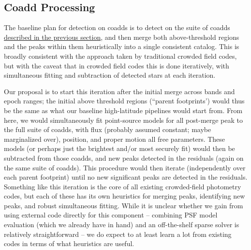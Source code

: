 \documentclass[DM,authoryear,toc]{lsstdoc}
\begin{document}
\subsection{Coadd Processing}
\label{sec:coadd-processing}

The baseline plan for detection on coadds is to detect on the suite of coadds \hyperref[sec:coaddition]{described in the previous section}, and then merge both above-threshold regions and the peaks within them heuristically into a single consistent catalog.
This is broadly consistent with the approach taken by traditional crowded field codes, but with the caveat that in crowded field codes this is done iteratively, with simultaneous fitting and subtraction of detected stars at each iteration.

Our proposal is to start this iteration after the initial merge across bands and epoch ranges; the initial above threshold regions (``parent footprints') would thus be the same as what our baseline high-latitude pipelines would start from.
From here, we would simultaneously fit point-source models for all post-merge peak to the full suite of coadds, with flux (probably assumed constant; maybe marginalized over), position, and proper motion all free parameters.
These models (or perhaps just the brightest and/or most securely fit) would then be subtracted from those coadds, and new peaks detected in the residuals (again on the same suite of coadds).
This procedure would then iterate (independently over each parent footprint) until no new significant peaks are detected in the residuals.
Something like this iteration is the core of all existing crowded-field photometry codes, but each of these has its own heuristics for merging peaks, identifying new peaks, and robust simultaneous fitting.
While it is unclear whether we gain from using external code directly for this component -- combining PSF model evaluation (which we already have in hand) and an off-the-shelf sparse solver is relatively straightforward -- we do expect to at least learn a lot from existing codes in terms of what heuristics are useful.
\end{document}
